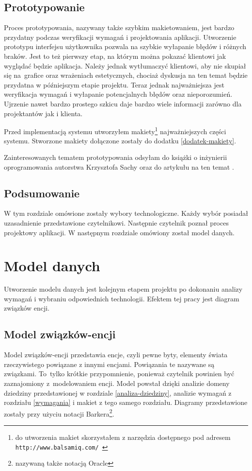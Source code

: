 \documentclass[a4paper,onecolumn,oneside,11pt,wide,floatssmall]{mwrep}
\def\url#1{{ \tt #1}}
\theoremstyle{definition}
\theoremstyle{plain}%
\theoremstyle{remark}
\begin{document}
\section{Prototypowanie}
Proces prototypowania, nazywany także szybkim makietowaniem, jest bardzo przydatny podczas weryfikacji wymagań i 
projektowania aplikacji. Utworzenie prototypu interfejsu użytkownika pozwala na szybkie wyłapanie błędów i różnych 
braków. Jest to też pierwszy etap, na którym można pokazać klientowi jak wyglądać będzie aplikacja. Należy jednak 
wytłumaczyć klientowi, aby nie skupiał się \mbox{na grafice} oraz wrażeniach estetycznych, chociaż dyskusja na ten temat 
będzie przydatna w późniejszym etapie projektu. Teraz jednak najważniejsza jest weryfikacja wymagań i wyłapanie 
potencjalnych błędów oraz nieporozumień. Ujrzenie nawet bardzo prostego szkicu daje bardzo wiele informacji zarówno 
dla projektantów jak i klienta.

Przed implementacją systemu utworzyłem makiety\footnote{do utworzenia makiet skorzystałem z narzędzia dostępnego pod adresem \url{http://www.balsamiq.com/ }} najważniejszych części systemu. Stworzone makiety dołączone zostały do dodatku \ref{dodatek-makiety}.

Zainteresowanych tematem prototypowania odsyłam do książki o inżynierii oprogramowania autorstwa Krzysztofa Sachy \cite{sacha2010inzynieria} oraz do artykułu na ten temat \cite{wireframes2012infoq}.


\section{Podsumowanie}
W tym rozdziale omówione zostały wybory technologiczne. Każdy wybór posiadał uzasadnienie przedstawione czytelnikowi. Następnie czytelnik poznał proces projektowy aplikacji. W następnym rozdziale omówiony został model danych.


\chapter{Model danych}
Utworzenie modelu danych jest kolejnym etapem projektu po dokonaniu analizy wymagań i wybraniu odpowiednich technologii. Efektem tej pracy jest diagram związków encji.

\section{Model związków-encji}
Model związków-encji przedstawia encje, czyli pewne byty, elementy świata rzeczywistego powiązane z innymi encjami. Powiązania te nazywane są związkami. \mbox{To tylko} krótkie przypomnienie, ponieważ czytelnik powinien być zaznajomiony \mbox{z modelowaniem} encji. 
Model powstał dzięki analizie domeny dziedziny przedstawionej w rozdziale \ref{analiza-dziedziny}, analizie wymagań z rozdziału \ref{wymagania} i makiet z tego samego rozdziału. Diagramy przedstawione zostały przy użyciu notacji Barkera\footnote{nazywaną także notacją Oracle}.
\end{document}
